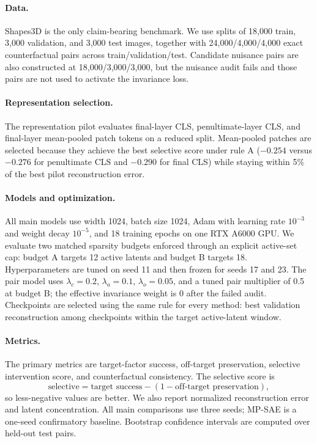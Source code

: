 \paragraph{Data.}
Shapes3D is the only claim-bearing benchmark. We use splits of 18{,}000 train, 3{,}000 validation, and 3{,}000 test images, together with 24{,}000/4{,}000/4{,}000 exact counterfactual pairs across train/validation/test. Candidate nuisance pairs are also constructed at 18{,}000/3{,}000/3{,}000, but the nuisance audit fails and those pairs are not used to activate the invariance loss.

\paragraph{Representation selection.}
The representation pilot evaluates final-layer CLS, penultimate-layer CLS, and final-layer mean-pooled patch tokens on a reduced split. Mean-pooled patches are selected because they achieve the best selective score under rule A ($-0.254$ versus $-0.276$ for penultimate CLS and $-0.290$ for final CLS) while staying within 5\% of the best pilot reconstruction error.

\paragraph{Models and optimization.}
All main models use width 1024, batch size 1024, Adam with learning rate $10^{-3}$ and weight decay $10^{-5}$, and 18 training epochs on one RTX A6000 GPU. We evaluate two matched sparsity budgets enforced through an explicit active-set cap: budget A targets 12 active latents and budget B targets 18. Hyperparameters are tuned on seed 11 and then frozen for seeds 17 and 23. The pair model uses $\lambda_c=0.2$, $\lambda_a=0.1$, $\lambda_o=0.05$, and a tuned pair multiplier of 0.5 at budget B; the effective invariance weight is 0 after the failed audit. Checkpoints are selected using the same rule for every method: best validation reconstruction among checkpoints within the target active-latent window.

\paragraph{Metrics.}
The primary metrics are target-factor success, off-target preservation, selective intervention score, and counterfactual consistency. The selective score is
\[
\text{selective} = \text{target success} - (1 - \text{off-target preservation}),
\]
so less-negative values are better. We also report normalized reconstruction error and latent concentration. All main comparisons use three seeds; MP-SAE is a one-seed confirmatory baseline. Bootstrap confidence intervals are computed over held-out test pairs.

